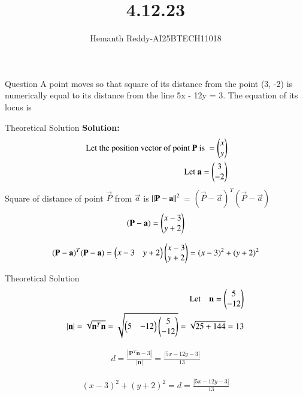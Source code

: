 \documentclass{beamer}
\title %
{ 4.12.23}
\author %
{Hemanth Reddy-AI25BTECH11018}
\begin{document}
\frame{\titlepage}
\begin{frame}{Question}
A point moves so that square of its distance from the point (3, -2) is numerically
equal to its distance from the line 5x - 12y = 3. The equation of its locus is
\end{frame}



\begin{frame}{Theoretical Solution}
\textbf{Solution:}\\

\begin{align}
   \text{ Let the position vector of point }  \mathbf{P} \text{ is }
   = \begin{pmatrix} x \\ y\end{pmatrix} \\
  \text{  Let }\mathbf{a} = \begin{pmatrix} 3 \\ -2\end{pmatrix} 
\end{align}
Square of distance of point $\vec{P}$ from $\vec{a}$ is $\left\lVert\mathbf{P} -\mathbf{a} \right\rVert^{2}$ = $(\vec{P} -\vec{a})^{T} (\vec{P} -\vec{a})$\\

\begin{align}
    (\mathbf{P} -\mathbf{a}) = \begin{pmatrix} x-3 \\ y+2\end{pmatrix} 
\end{align}

\begin{align}
    (\mathbf{P} -\mathbf{a})^{T}(\mathbf{P} -\mathbf{a})= \begin{pmatrix} x-3 & y+2\end{pmatrix}\begin{pmatrix} x-3 \\ y+2\end{pmatrix} = (x-3)^{2}+(y+2)^{2}
\end{align}





\end{frame}
\begin{frame}{Theoretical Solution}
\begin{align}
     \text{Let} \quad \mathbf{n} = \begin{pmatrix} 5 \\-12\end{pmatrix}  \\
     |\textbf{n}| = \sqrt{\textbf{n}^T \textbf{n}} = \sqrt{\begin{pmatrix} 5 & -12\end{pmatrix} \begin{pmatrix} 5 \\-12\end{pmatrix}} = \sqrt{25+144} = 13 
\end{align}

\begin{align}
    d = \frac{|\textbf{P}^T \textbf{n} - 3|}{|\textbf{n}|} = \frac{|5x - 12y - 3|}{13}
\end{align}

\begin{align}
   (x-3)^{2}+(y+2)^{2}= d = \frac{|5x - 12y - 3|}{13}
\end{align}



\end{frame}
\end{document}
